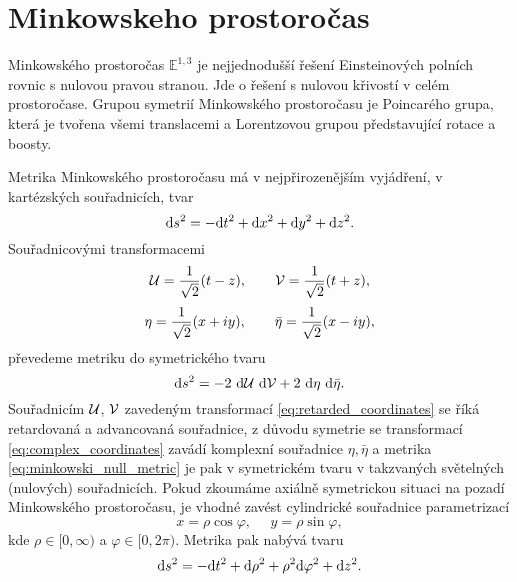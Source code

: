 \section{Minkowskeho prostoročas}
Minkowského prostoročas $\mathbb{E}^{1,3}$ je nejjednodušší řešení Einsteinových polních rovnic s nulovou pravou stranou.
Jde o řešení s nulovou křivostí v celém prostoročase. Grupou symetrií Minkowského prostoročasu je Poincarého
grupa, která je tvořena všemi translacemi a Lorentzovou grupou představující rotace a boosty.

Metrika Minkowského prostoročasu má v nejpřirozenějším vyjádření, v kartézských souřadnicích, tvar
\begin{equation}
     \label{eq:minkowski}
     \mathrm{d} s^2 = - \mathrm{d} t^2 + \mathrm{d} x^2 + \mathrm{d} y^2 + \mathrm{d} z^2.
\end{equation}
Souřadnicovými transformacemi
\begin{equation}
     \label{eq:retarded_coordinates}
     \mathcal{U} = \frac{1}{\sqrt{2}} (t - z),~~~~~~\mathcal{V} = \frac{1}{\sqrt{2}} (t + z),
\end{equation}
\begin{equation}
     \label{eq:complex_coordinates}
     \eta = \frac{1}{\sqrt{2}} (x + iy), ~~~~~~\bar{\eta} = \frac{1}{\sqrt{2}} (x - iy),
\end{equation}
převedeme metriku do symetrického tvaru
\begin{equation}
     \label{eq:minkowski_null_metric}
     \mathrm{d} s^2 = -2 ~ \mathrm{d} \mathcal{U} ~ \mathrm{d} \mathcal{V} + 2 ~ \mathrm{d} \eta ~ \mathrm{d} \bar{\eta}.
\end{equation}
Souřadnicím $\mathcal{U}$, $\mathcal{V}$ zavedeným transformací \eqref{eq:retarded_coordinates} se říká retardovaná a advancovaná souřadnice,
z důvodu symetrie se transformací \eqref{eq:complex_coordinates} zavádí komplexní souřadnice $\eta, \bar{\eta}$ a
metrika \eqref{eq:minkowski_null_metric} je pak v symetrickém tvaru v takzvaných světelných (nulových) souřadnicích.
Pokud zkoumáme axiálně symetrickou situaci na pozadí Minkowského prostoročasu, je vhodné zavést cylindrické
souřadnice parametrizací
\begin{equation}
     x = \rho \cos \varphi, ~~~~~~ y = \rho \sin \varphi,
\end{equation}
kde $\rho \in [0, \infty)$ a $\varphi \in [0, 2\pi)$. Metrika pak nabývá tvaru
\begin{equation}
     \mathrm{d} s^2 = -\mathrm{d} t^2 + \mathrm{d} \rho^2 + \rho^2 \mathrm{d} \varphi^2 + \mathrm{d} z^2.
\end{equation}

